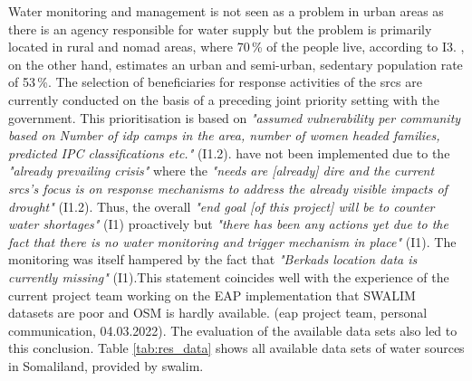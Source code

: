 Water monitoring and management is not seen as a problem in urban areas as there is an agency responsible for water supply but the problem is primarily located in rural and nomad areas, where 70\,\% of the people live, according to I3. \Textcite{republicofsomaliaRepublicSomalilandCountry2021}, on the other hand, estimates an urban and semi-urban, sedentary population rate of 53\,\%.\newline
The selection of beneficiaries for response activities of the \acrshort{srcs} are currently conducted on the basis of a preceding joint priority setting with the government. This prioritisation is based on \textit{"assumed vulnerability per community based on Number of \acrfull{idp} camps in the area, number of women headed families, predicted IPC classifications etc."} (I1.2).  have not been implemented due to the \textit{"already prevailing crisis"} where the \textit{"needs are [already] dire and the current \acrshort{srcs}'s focus is on response mechanisms to address the already visible impacts of drought"} (I1.2). Thus, the overall \textit{"end goal [of this project] will be to counter water shortages"} (I1) proactively but \textit{"there has been any actions yet due to the fact that there is no water monitoring and trigger mechanism in place"} (I1). The monitoring was itself hampered by the fact that \textit{"Berkads location data is currently missing"} (I1).This statement coincides well with the experience of the current project team working on the EAP implementation that SWALIM datasets are poor and OSM is hardly available. (\acrshort{eap} project team, personal communication, 04.03.2022). The evaluation of the available data sets also led to this conclusion.\newline
Table \ref{tab:res_data} shows all available data sets of water sources in Somaliland, provided by \acrshort{swalim}.

